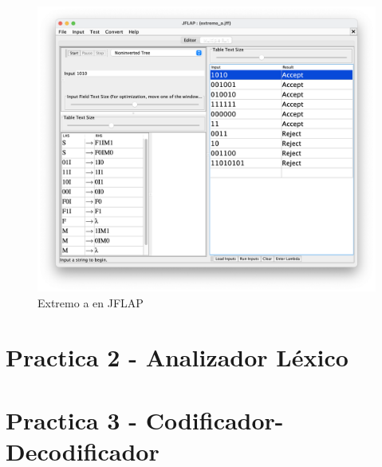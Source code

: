 \begin{figure}[H] 
	\centering
	\includegraphics[scale=0.35]{../practica_1/images/extremo_a.png} 
	\caption{Extremo a en JFLAP} 
    \label{fig:extremo_a}
\end{figure}

\section{Practica 2 - Analizador Léxico}

\section{Practica 3 - Codificador-Decodificador}



